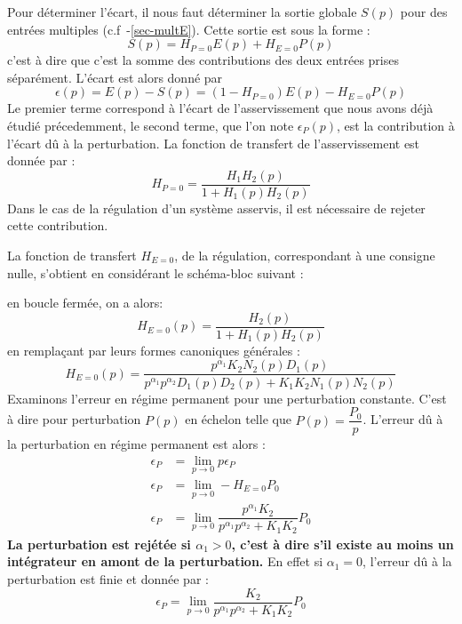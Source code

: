 Pour déterminer l'écart, il nous faut déterminer la sortie globale $S(p)$ pour
des entrées multiples (c.f~-\cref{sec-multE}).
Cette sortie est sous la forme :
\[
S(p)=H_{P=0}E(p)+H_{E=0}P(p)
\]
c'est à dire que c'est la somme des contributions des deux entrées prises
séparément.
L'écart est alors donné par 
\[
\epsilon(p)=E(p)-S(p)=\left(1-H_{P=0}\right)E(p)-H_{E=0}P(p)
\]
Le premier terme correspond à l'écart de l'asservissement que nous avons 
déjà étudié précedemment, le second terme, que l'on note $\epsilon_P(p)$, 
est la contribution à l'écart dû à la perturbation.
La fonction de transfert de l'asservissement est donnée par :
\[
H_{P=0}=\dfrac{H_1H_2(p)}{1+H_1(p)H_2(p)} 
\]
Dans le cas de la régulation d'un système asservis, il est nécessaire de 
rejeter cette contribution.

La fonction de transfert $H_{E=0}$, de la régulation, correspondant à une 
consigne nulle, s'obtient en considérant le schéma-bloc suivant :
\begin{center}                                                  
    
\end{center}                                                    
\newcommand{\pau}{p^{\alpha_1}}
\newcommand{\pad}{p^{\alpha_2}}
en boucle fermée, on a alors:
\[
H_{E=0}(p)=\dfrac{H_2(p)}{1+H_1(p)H_2(p)}
\]
en remplaçant par leurs formes canoniques générales :
\[
H_{E=0}(p)=
\dfrac{\pau K_2N_2(p)D_1(p)}{\pau\pad D_1(p)D_2(p)+K_1K_2N_1(p)N_2(p)}
\]
Examinons l'erreur en régime permanent pour une perturbation constante.
C'est à dire pour perturbation $P(p)$ en échelon telle que 
$P(p)=\dfrac{P_0}{p}$. L'erreur dû à la perturbation en régime permanent 
est alors :
\begin{align*}
    \epsilon_P&=\lim\limits_{p\to0} p\epsilon_P\\
    \epsilon_P&=\lim\limits_{p\to0} -H_{E=0}P_0\\
    \epsilon_P&=\lim\limits_{p\to0}\dfrac{\pau K_2}{\pau\pad+K_1K_2}P_0
\end{align*}
\textbf{La perturbation est rejétée si $\alpha_1>0$, c'est à dire s'il existe
au moins un intégrateur en amont de la perturbation.}
En effet si $\alpha_1=0$, l'erreur dû à la perturbation est finie et 
donnée par :
\[
\epsilon_P=\lim\limits_{p\to0}\dfrac{K_2}{\pau\pad+K_1K_2}P_0
\]
